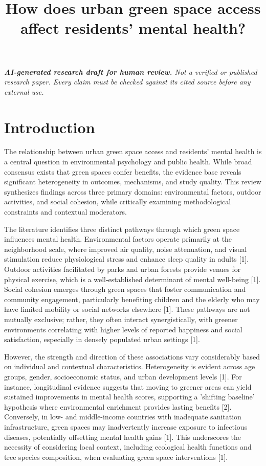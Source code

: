 \documentclass[conference]{IEEEtran}
\title{How does urban green space access affect residents' mental health?}
\author{\IEEEauthorblockN{ResearchGenie}\IEEEauthorblockA{AI-generated research draft}}
\begin{document}
\maketitle
\textit{\textbf{AI-generated research draft for human review.} Not a verified or published research paper. Every claim must be checked against its cited source before any external use.}\par

\section{Introduction}
The relationship between urban green space access and residents' mental health is a central question in environmental psychology and public health. While broad consensus exists that green spaces confer benefits, the evidence base reveals significant heterogeneity in outcomes, mechanisms, and study quality. This review synthesizes findings across three primary domains: environmental factors, outdoor activities, and social cohesion, while critically examining methodological constraints and contextual moderators.

The literature identifies three distinct pathways through which green space influences mental health. Environmental factors operate primarily at the neighborhood scale, where improved air quality, noise attenuation, and visual stimulation reduce physiological stress and enhance sleep quality in adults [1]. Outdoor activities facilitated by parks and urban forests provide venues for physical exercise, which is a well-established determinant of mental well-being [1]. Social cohesion emerges through green spaces that foster communication and community engagement, particularly benefiting children and the elderly who may have limited mobility or social networks elsewhere [1]. These pathways are not mutually exclusive; rather, they often interact synergistically, with greener environments correlating with higher levels of reported happiness and social satisfaction, especially in densely populated urban settings [1].

However, the strength and direction of these associations vary considerably based on individual and contextual characteristics. Heterogeneity is evident across age groups, gender, socioeconomic status, and urban development levels [1]. For instance, longitudinal evidence suggests that moving to greener areas can yield sustained improvements in mental health scores, supporting a 'shifting baseline' hypothesis where environmental enrichment provides lasting benefits [2]. Conversely, in low- and middle-income countries with inadequate sanitation infrastructure, green spaces may inadvertently increase exposure to infectious diseases, potentially offsetting mental health gains [1]. This underscores the necessity of considering local context, including ecological health functions and tree species composition, when evaluating green space interventions [1].
\end{document}
